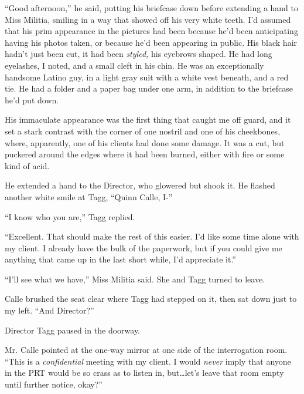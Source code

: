 ``Good afternoon,'' he said, putting his briefcase down before extending a hand to Miss Militia, smiling in a way that showed off his very white teeth.  I'd assumed that his prim appearance in the pictures had been because he'd been anticipating having his photos taken, or because he'd been appearing in public.  His black hair hadn't just been cut, it had been \emph{styled,} his eyebrows shaped.  He had long eyelashes, I noted, and a small cleft in his chin.  He was an exceptionally handsome Latino guy, in a light gray suit with a white vest beneath, and a red tie.  He had a folder and a paper bag under one arm, in addition to the briefcase he'd put down.



His immaculate appearance was the first thing that caught me off guard, and it set a stark contrast with the corner of one nostril and one of his cheekbones, where, apparently, one of his clients had done some damage.  It was a cut, but puckered around the edges where it had been burned, either with fire or some kind of acid.



He extended a hand to the Director, who glowered but shook it.  He flashed another white smile at Tagg, ``Quinn Calle, I-''



``I know who you are,'' Tagg replied.



``Excellent.  That should make the rest of this easier.  I'd like some time alone with my client.  I already have the bulk of the paperwork, but if you could give me anything that came up in the last short while, I'd appreciate it.''



``I'll see what we have,'' Miss Militia said.  She and Tagg turned to leave.



Calle brushed the seat clear where Tagg had stepped on it, then sat down just to my left.  ``And Director?''



Director Tagg paused in the doorway.



Mr. Calle pointed at the one-way mirror at one side of the interrogation room.  ``This is a \emph{confidential} meeting with my client.  I would \emph{never} imply that anyone in the PRT would be so crass as to listen in, but\ldots let's leave that room empty until further notice, okay?''



